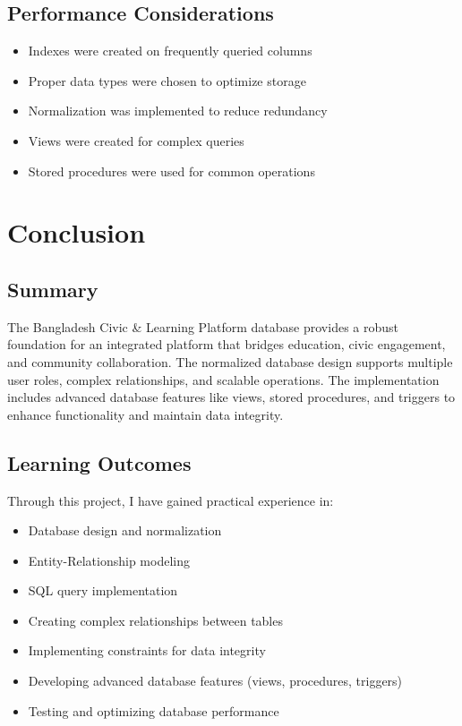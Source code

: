 \documentclass[12pt]{report}
\begin{document}
    \section{Performance Considerations}
    \begin{itemize}
        \item Indexes were created on frequently queried columns
        \item Proper data types were chosen to optimize storage
        \item Normalization was implemented to reduce redundancy
        \item Views were created for complex queries
        \item Stored procedures were used for common operations
    \end{itemize}
    
    \chapter{Conclusion}
    
    \section{Summary}
    The Bangladesh Civic \& Learning Platform database provides a robust foundation for an integrated platform that bridges education, civic engagement, and community collaboration. The normalized database design supports multiple user roles, complex relationships, and scalable operations. The implementation includes advanced database features like views, stored procedures, and triggers to enhance functionality and maintain data integrity.
    
    \section{Learning Outcomes}
    Through this project, I have gained practical experience in:
    \begin{itemize}
        \item Database design and normalization
        \item Entity-Relationship modeling
        \item SQL query implementation
        \item Creating complex relationships between tables
        \item Implementing constraints for data integrity
        \item Developing advanced database features (views, procedures, triggers)
        \item Testing and optimizing database performance
    \end{itemize}
    
\end{document}
